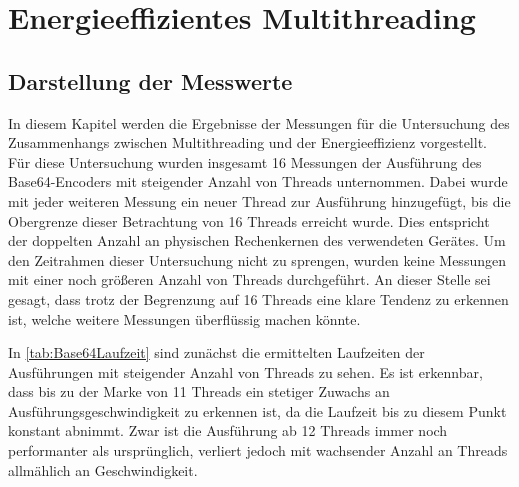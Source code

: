 \chapter{Energieeffizientes Multithreading}

\section{Darstellung der Messwerte}

In diesem Kapitel werden die Ergebnisse der Messungen für die Untersuchung des Zusammenhangs zwischen Multithreading und der Energieeffizienz vorgestellt. Für diese Untersuchung wurden insgesamt 16 Messungen der Ausführung des Base64-Encoders mit steigender Anzahl von Threads unternommen. Dabei wurde mit jeder weiteren Messung ein neuer Thread zur Ausführung hinzugefügt, bis die Obergrenze dieser Betrachtung von 16 Threads erreicht wurde. Dies entspricht der doppelten Anzahl an  physischen Rechenkernen des verwendeten Gerätes. Um den Zeitrahmen dieser Untersuchung nicht zu sprengen, wurden keine Messungen mit einer noch größeren Anzahl von Threads durchgeführt. An dieser Stelle sei gesagt, dass trotz der Begrenzung auf 16 Threads eine klare Tendenz zu erkennen ist, welche weitere Messungen überflüssig machen könnte.

In \autoref{tab:Base64Laufzeit} sind zunächst die ermittelten Laufzeiten der Ausführungen mit steigender Anzahl von Threads zu sehen. Es ist erkennbar, dass bis zu der Marke von 11 Threads ein stetiger Zuwachs an Ausführungsgeschwindigkeit zu erkennen ist, da die Laufzeit bis zu diesem Punkt konstant abnimmt. Zwar ist die Ausführung ab 12 Threads immer noch performanter als ursprünglich, verliert jedoch mit wachsender Anzahl an Threads allmählich an Geschwindigkeit.



